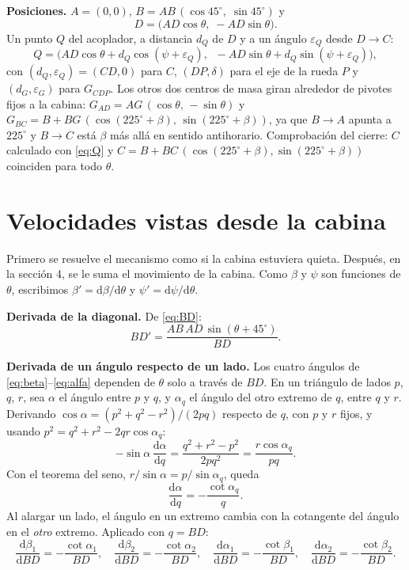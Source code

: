 \documentclass[11pt,a4paper]{article}
\newcommand{\dd}{\mathrm{d}}
\begin{document}
\textbf{Posiciones.} \(A=(0,0)\), \(B=AB\,(\cos45^\circ,\;\sin45^\circ)\) y
\begin{equation}
D=\bigl(AD\cos\theta,\;-AD\sin\theta\bigr).
\label{eq:D}
\end{equation}
Un punto \(Q\) del acoplador, a distancia \(d_Q\) de \(D\) y a un ángulo \(\varepsilon_Q\) desde \(D\!\to\!C\):
\begin{equation}
Q=\bigl(AD\cos\theta+d_Q\cos(\psi+\varepsilon_Q),\;\;-AD\sin\theta+d_Q\sin(\psi+\varepsilon_Q)\bigr),
\label{eq:Q}
\end{equation}
con \((d_Q,\varepsilon_Q)=(CD,0)\) para \(C\), \((DP,\delta)\) para el eje de la rueda \(P\) y
\((d_G,\varepsilon_G)\) para \(G_{CDP}\). Los otros dos centros de masa giran alrededor de pivotes fijos a la
cabina: \(G_{AD}=AG\,(\cos\theta,\,-\sin\theta)\) y
\(G_{BC}=B+BG\,(\cos(225^\circ+\beta),\,\sin(225^\circ+\beta))\), ya que \(B\!\to\!A\) apunta a \(225^\circ\)
y \(B\!\to\!C\) está \(\beta\) más allá en sentido antihorario. Comprobación del cierre: \(C\) calculado con
\eqref{eq:Q} y \(C=B+BC\,(\cos(225^\circ+\beta),\sin(225^\circ+\beta))\) coinciden para todo \(\theta\).

\section{Velocidades vistas desde la cabina}

Primero se resuelve el mecanismo como si la cabina estuviera quieta. Después, en la sección 4, se le suma el
movimiento de la cabina. Como \(\beta\) y \(\psi\) son funciones de \(\theta\), escribimos
\(\beta'=\dd\beta/\dd\theta\) y \(\psi'=\dd\psi/\dd\theta\).

\textbf{Derivada de la diagonal.} De \eqref{eq:BD}:
\begin{equation}
BD'=\frac{AB\,AD\,\sin(\theta+45^\circ)}{BD}.
\label{eq:dBD}
\end{equation}

\textbf{Derivada de un ángulo respecto de un lado.} Los cuatro ángulos de \eqref{eq:beta}--\eqref{eq:alfa}
dependen de \(\theta\) solo a través de \(BD\). En un triángulo de lados \(p\), \(q\), \(r\), sea \(\alpha\)
el ángulo entre \(p\) y \(q\), y \(\alpha_q\) el ángulo del otro extremo de \(q\), entre \(q\) y \(r\).
Derivando \(\cos\alpha=(p^2+q^2-r^2)/(2pq)\) respecto de \(q\), con \(p\) y \(r\) fijos, y usando
\(p^2=q^2+r^2-2qr\cos\alpha_q\):
\[
-\sin\alpha\,\frac{\dd\alpha}{\dd q}=\frac{q^2+r^2-p^2}{2pq^2}=\frac{r\cos\alpha_q}{pq}.
\]
Con el teorema del seno, \(r/\sin\alpha=p/\sin\alpha_q\), queda
\begin{equation}
\frac{\dd\alpha}{\dd q}=-\frac{\cot\alpha_q}{q}.
\label{eq:lema}
\end{equation}
Al alargar un lado, el ángulo en un extremo cambia con la cotangente del ángulo en el \emph{otro} extremo.
Aplicado con \(q=BD\):
\begin{equation}
\frac{\dd\beta_1}{\dd BD}=-\frac{\cot\alpha_1}{BD},\quad
\frac{\dd\beta_2}{\dd BD}=-\frac{\cot\alpha_2}{BD},\quad
\frac{\dd\alpha_1}{\dd BD}=-\frac{\cot\beta_1}{BD},\quad
\frac{\dd\alpha_2}{\dd BD}=-\frac{\cot\beta_2}{BD}.
\label{eq:dang}
\end{equation}
\end{document}
